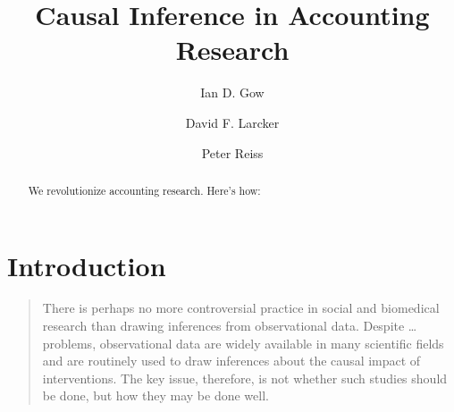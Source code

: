 \documentclass[11pt]{amsart}
\title[Causal Inference]{Causal Inference in Accounting Research}
\author{Ian D. Gow \and David F. Larcker \and Peter Reiss}
\begin{document}
\usetikzlibrary{automata, shapes, calc, positioning}



\maketitle

\begin{abstract}
	We revolutionize accounting research. Here's how:
\end{abstract}


\clearpage

 
\section{Introduction}

\begin{quotation}
	There is perhaps no more controversial practice in social and biomedical research than drawing inferences from observational data.
	Despite \dots problems, observational data are widely available in many scientific fields and are routinely used to draw inferences about the causal impact of interventions.
	The key issue, therefore, is not whether such studies should be done, but how they may be done well.
\end{quotation}
\end{document}
